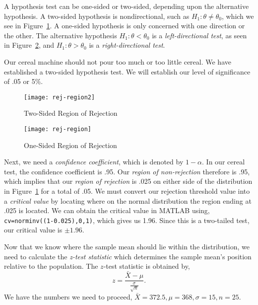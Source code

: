 \marginpar{\begin{small}\begin{flushleft}\textcolor{blue}{Two-sided hypothesis test divides the $\alpha$ equally on both tails.}\end{flushleft}\end{small}}
A hypothesis test can be one-sided or two-sided, depending upon the alternative hypothesis. A two-sided hypothesis is nondirectional, such as $H_1: \theta \ne \theta_0$, which we see in Figure~\ref{figure:rej-region2}. A one-sided hypothesis is only concerned with one direction or the other. The alternative hypothesis $H_1: \theta < \theta_0$ is a \emph{left-directional test}, as seen in Figure~\ref{figure:rej-region}, and $H_1: \theta > \theta_0$ is a \emph{right-directional test}.

Our cereal machine should not pour too much or too little cereal. We have established a two-sided hypothesis test. We will establish our level of significance of .05 or 5\%.

\begin{figure}[t]
  \centering
  \texttt{[image: rej-region2]}
  \caption{Two-Sided Region of Rejection}
  \label{figure:rej-region2}
\end{figure}
\begin{figure}[t]
  \centering
  \texttt{[image: rej-region]}
  \caption{One-Sided Region of Rejection}
  \label{figure:rej-region}
\end{figure}

Next, we need a \emph{confidence coefficient}, which is denoted by $1-\alpha$. In our cereal test, the confidence coefficient is .95. Our \emph{region of non-rejection} therefore is .95, which implies that our \emph{region of rejection} is .025 on either side of the distribution in Figure~\ref{figure:rej-region2} for a total of .05. We must convert our rejection threshold value into a \emph{critical value} by locating where on the normal distribution the region ending at .025 is located. We can obtain the critical value in MATLAB using,
\texttt{cv=norminv((1-0.025),0,1)}, which gives  us 1.96. Since this is a two-tailed test, our critical value is $\pm 1.96$.

Now that we know where the sample mean should lie within the distribution, we need to calculate the \emph{z-test statistic} which determines the sample mean's position relative to the population. The $z$-test statistic is obtained by,
\begin{equation}
\boxed{\quad z = \frac{\bar{X} - \mu}{\frac{\sigma}{\sqrt{n}}}. \quad}
\label{eq:z-test}
\end{equation}
We have the numbers we need to proceed, $\bar{X}=372.5, \mu=368, \sigma=15, n=25$.

